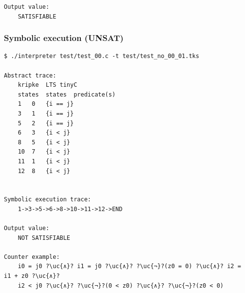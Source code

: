 \documentclass[english,a4paper,oneside]{article}%
\newcommand{\uc}[1]{ \scriptsize{\texttt{#1}} }
\begin{document}
\begin{scriptsize}
\begin{lstlisting}
Output value:
	SATISFIABLE

\end{lstlisting}
\end{scriptsize}



\newpage
\subsubsection{Symbolic execution (UNSAT)}
\begin{scriptsize}
\begin{lstlisting}
$ ./interpreter test/test_00.c -t test/test_no_00_01.tks 

Abstract trace:
	kripke	LTS	tinyC
	states	states	predicate(s)
	1	0	{i == j}
	3	1	{i == j}
	5	2	{i == j}
	6	3	{i < j}
	8	5	{i < j}
	10	7	{i < j}
	11	1	{i < j}
	12	8	{i < j}
								

Symbolic execution trace:
	1->3->5->6->8->10->11->12->END

Output value:
	NOT SATISFIABLE

Counter example:
	i0 = j0 ?\uc{∧}? i1 = j0 ?\uc{∧}? ?\uc{¬}?(z0 = 0) ?\uc{∧}? i2 = i1 + z0 ?\uc{∧}? 
	i2 < j0 ?\uc{∧}? ?\uc{¬}?(0 < z0) ?\uc{∧}? ?\uc{¬}?(z0 < 0)
	
\end{lstlisting}
\end{scriptsize}

\newpage
\end{document}
